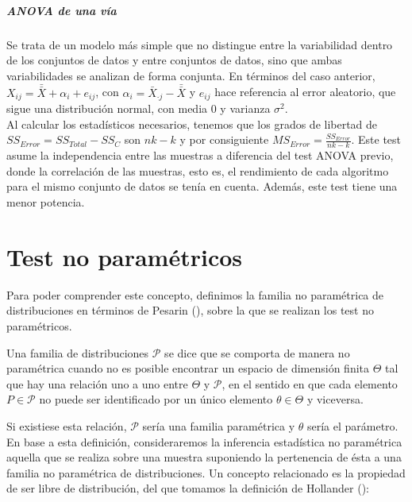 \paragraph{ANOVA de una vía} Se trata de un modelo más 
simple que no distingue entre la variabilidad dentro de los
conjuntos de datos y entre conjuntos de datos, sino que ambas
variabilidades se analizan de forma conjunta. En términos del
caso anterior, $X_{ij} = \bar{\bar{X}} + \alpha_i + e_{ij}$, 
con $\alpha_i = \bar{X}_{\cdot j} - \bar{\bar{X}}$ y $e_{ij}$
hace referencia al error aleatorio, que sigue una 
distribución normal, con media $0$ y varianza $\sigma^2$. \\
	Al calcular los estadísticos necesarios, tenemos que los 
grados de libertad de $SS_{Error} = SS_{Total} - SS_{C}$ son 
$nk-k$ y por consiguiente $MS_{Error} = \frac{SS_{Error}}
{nk-k}$. Este test asume la independencia entre las muestras
a diferencia del test ANOVA previo, donde la correlación de 
las muestras, esto es, el rendimiento de cada algoritmo para
el mismo conjunto de datos se tenía en cuenta. Además, este
test tiene una menor potencia.
	

\chapter{Test no paramétricos}
\label{chapter:test_no_parametricos}

	Para poder comprender este concepto, definimos la familia 
no paramétrica de distribuciones en términos de Pesarin 
(\cite{pesarin2010permutation}), sobre 
la que se realizan los test no paramétricos. 
 
\begin{definicion}
	Una familia de distribuciones $\mathcal{P}$ se dice que 
se comporta de manera no paramétrica cuando no es posible
encontrar un espacio de dimensión finita $\Theta$ tal que hay 
una relación uno a uno entre $\Theta$ y $\mathcal{P}$, en el 
sentido en que cada elemento $P \in \mathcal{P}$ no puede ser 
identificado por un único elemento $\theta \in \Theta$ y 
viceversa.
\end{definicion}

	Si existiese esta relación, $\mathcal{P}$ sería una 
familia paramétrica y $\theta$ sería el parámetro.\\
	En base a esta definición, consideraremos la inferencia 
estadística no paramétrica aquella que se realiza sobre una 
muestra suponiendo la pertenencia de ésta a una familia no 
paramétrica de distribuciones. Un concepto relacionado es la 
propiedad de ser libre de distribución, del que tomamos la definición de Hollander (\cite{Hollander99}):
	
